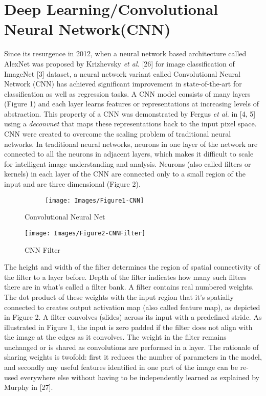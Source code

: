 \documentclass [11pt,letterpaper ,twoside ,openany ]{report}
\begin{document}
    \chapter{Deep Learning/Convolutional Neural Network(CNN)}
    \doublespacing
    Since its resurgence in 2012, when a neural network based architecture called AlexNet was proposed by Krizhevsky \textit {et al.} [26] for image classification of ImageNet [3] dataset, a neural network variant called Convolutional Neural Network (CNN) has achieved significant improvement in state-of-the-art for classification as well as regression tasks. A CNN model consists of many layers (Figure 1) and each layer learns features or representations at increasing levels of abstraction. This property of a CNN was demonstrated by Fergus \textit{et al.} in [4, 5] using a \textit{deconvnet} that maps these representations back to the input pixel space. CNN were created to overcome the scaling problem of traditional neural networks. In traditional neural networks, neurons in one layer of the network are connected to all the neurons in adjacent layers, which makes it difficult to scale for intelligent image understanding and analysis.  Neurons (also called filters or kernels) in each layer of the CNN are connected only to a small region of the input and are three dimensional (Figure 2). 

    \begin{figure}[h]
      \centering
      \begin{subfigure}[b]{0.90\linewidth}
        \texttt{[image: Images/Figure1-CNN]}
      \end{subfigure}
      \caption{Convolutional Neural Net}
      \label{fig:cnn}
    \end{figure}


    \begin{wrapfigure}{l}{0.5\textwidth}
        \begin{center}
            \texttt{[image: Images/Figure2-CNNFilter]}
        \end{center}
        \caption{CNN Filter}
    \end{wrapfigure}

    The height and width of the filter determines the region of spatial connectivity of the filter to a layer before. Depth of the filter indicates how many such filters there are in what's called a filter bank. A filter contains real numbered weights. The dot product of these weights with the input region that it's spatially connected to creates output activation map (also called feature map), as depicted in Figure 2. A filter convolves (slides) across its input with a predefined stride. As illustrated in Figure 1, the input is zero padded if the filter  does not align with the image at the edges as it convolves. The weight in the filter remains unchanged or is shared as convolutions are performed in a layer. The rationale of sharing weights is twofold: first it reduces the number of parameters in the model, and secondly any useful features identified in one part of the image can be re-used everywhere else without having to be independently learned as explained by Murphy in [27].\\
\end{document}
